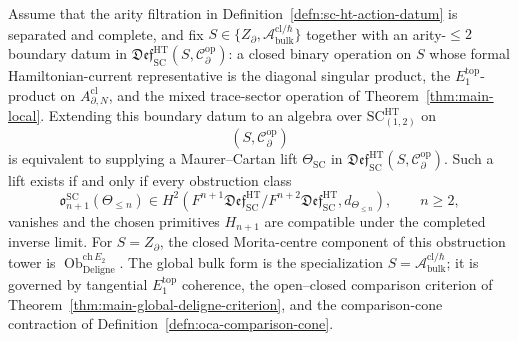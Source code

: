 \begin{thm}
\label{thm:sc-ht-deligne-swiss-cheese}

Assume that the arity filtration in
Definition~\ref{defn:sc-ht-action-datum} is separated and complete, and
fix \(S\in\{Z_\partial,\mathcal A^{\mathrm{cl}/\hbar}_{\mathrm{bulk}}\}\)
together with an arity-\(\le2\) boundary datum in
\(\mathfrak{Def}^{\mathrm{HT}}_{\mathrm{SC}}
(S,\mathcal C^{\mathrm{op}}_\partial)\): a closed binary operation on
\(S\) whose formal Hamiltonian-current representative is the diagonal
singular product, the \(E_1^{\mathrm{top}}\)-product on
\(A^{\mathrm{cl}}_{\partial,N}\), and the mixed trace-sector operation
of Theorem~\ref{thm:main-local}.  Extending this boundary datum to an
algebra over \(\mathrm{SC}^{\mathrm{HT}}_{(1,2)}\) on
\[
  (S,\mathcal C^{\mathrm{op}}_\partial)
\]
is equivalent to supplying a Maurer--Cartan lift
\(\Theta_{\mathrm{SC}}\) in
\(\mathfrak{Def}^{\mathrm{HT}}_{\mathrm{SC}}
(S,\mathcal C^{\mathrm{op}}_\partial)\).
Such a lift exists if and only if every obstruction class
\[
  \mathfrak o^{\mathrm{SC}}_{n+1}(\Theta_{\le n})
  \in
  H^2\!\left(
    F^{n+1}\mathfrak{Def}^{\mathrm{HT}}_{\mathrm{SC}}/
    F^{n+2}\mathfrak{Def}^{\mathrm{HT}}_{\mathrm{SC}},
    d_{\Theta_{\le n}}\right),
  \qquad n\ge2,
\]
vanishes and the chosen primitives \(H_{n+1}\) are compatible under the
completed inverse limit.  For \(S=Z_\partial\), the closed
Morita-centre component of this obstruction tower is
\(\operatorname{Ob}^{\mathrm{ch}\,E_2}_{\mathrm{Deligne}}\).  The global
bulk form is the specialization \(S=\mathcal A^{\mathrm{cl}/\hbar}_{\mathrm{bulk}}\);
it is governed by tangential \(E_1^{\mathrm{top}}\) coherence, the
open--closed comparison criterion of
Theorem~\ref{thm:main-global-deligne-criterion}, and the
comparison-cone contraction of
Definition~\ref{defn:oca-comparison-cone}.


\end{thm}
